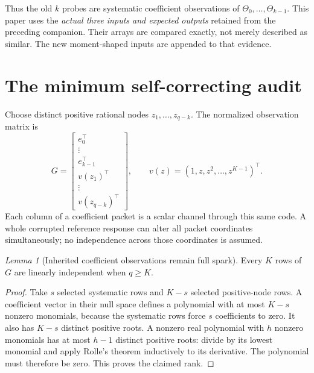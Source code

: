 \documentclass[11pt,letterpaper]{article}
\theoremstyle{remark}\newtheorem{remark}{Remark}[section]
\newtheorem{lemma}{Lemma}[section]
\begin{document}
Thus the old $k$ probes are systematic coefficient observations of $\Theta_0,\ldots,\Theta_{k-1}$. This paper uses the \emph{actual three inputs and expected outputs} retained from the preceding companion. Their arrays are compared exactly, not merely described as similar. The new moment-shaped inputs are appended to that evidence.

\section{The minimum self-correcting audit}
\label{sec:minimum}
Choose distinct positive rational nodes $z_1,\ldots,z_{q-k}$. The normalized observation matrix is
\begin{equation}
 G=\begin{bmatrix}
 e_0^\top\\ \vdots\\e_{k-1}^\top\\
 v(z_1)^\top\\ \vdots\\v(z_{q-k})^\top
 \end{bmatrix},\qquad
 v(z)=(1,z,z^2,\ldots,z^{K-1})^\top.
 \label{eq:code}
\end{equation}
Each column of a coefficient packet is a scalar channel through this same code. A whole corrupted reference response can alter all packet coordinates simultaneously; no independence across those coordinates is assumed.

\begin{lemma}[Inherited coefficient observations remain full spark]\label{lem:spark}
Every $K$ rows of $G$ are linearly independent when $q\ge K$.
\end{lemma}
\begin{proof}
Take $s$ selected systematic rows and $K-s$ selected positive-node rows. A coefficient vector in their null space defines a polynomial with at most $K-s$ nonzero monomials, because the systematic rows force $s$ coefficients to zero. It also has $K-s$ distinct positive roots. A nonzero real polynomial with $h$ nonzero monomials has at most $h-1$ distinct positive roots: divide by its lowest monomial and apply Rolle's theorem inductively to its derivative. The polynomial must therefore be zero. This proves the claimed rank.
\end{proof}
\end{document}
